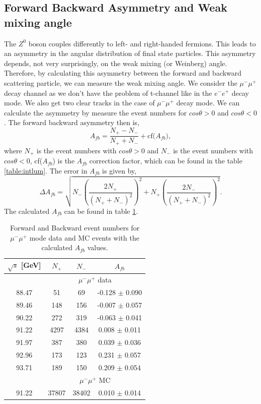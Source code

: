 \subsection{Forward Backward Asymmetry and Weak mixing angle}
The $Z^0$ boson couples differently to left- and right-handed fermions. This leads to an asymmetry in the angular distribution of final state particles. This asymmetry depends, not very surprisingly, on the weak mixing (or Weinberg) angle\cite{thomson_2013}. Therefore, by calculating this asymmetry between the forward and backward scattering particle, we can measure the weak mixing angle. We consider the $\mu^-\mu^+$ decay channel as we don't have the problem of t-channel like in the $e^-e^+$ decay mode. We also get two clear tracks in the case of $\mu^-\mu^+$ decay mode. We can calculate the asymmetry by measure the event numbers for $cos\theta > 0$ and $cos\theta < 0$. The forward backward asymmetry then is,
\begin{equation}
    A_{fb} = \frac{N_+ - N_-}{N_+ + N_-} + \text{cf($A_{fb}$)},
\end{equation}
where $N_+$ is the event numbers with $cos\theta > 0$ and $N_-$ is the event numbers with $cos\theta < 0$, cf($A_{fb}$) is the $A_{fb}$ correction factor, which can be found in the table \ref{table:intlum}. The error in $A_{fb}$ is given by,
\begin{equation}
    \Delta A_{fb} = \sqrt{N_-\left(\frac{2N_+}{(N_+ + N_-)^2}\right)^2 + 
    N_+\left(\frac{2N_-}{(N_+ + N_-)^2}\right)^2}.
\end{equation}
The calculated $A_{fb}$ can be found in table \ref{table:afb}.\\
\begin{table}[h!]
\centering
\begin{tabular}{c|ccc}
\hline
$\sqrt{s}$ {[}GeV{]} & $N_+$ & $N_-$ & $A_{fb}$           \\ \hline
                    & \multicolumn{3}{c}{$\mu^-\mu^+$ data}  \\ \hline
88.47                & 51    & 69    & -0.128 $\pm$ 0.090 \\
89.46                & 148   & 156   & -0.007 $\pm$ 0.057 \\
90.22                & 272   & 319   & -0.063 $\pm$ 0.041 \\
91.22                & 4297  & 4384  & 0.008 $\pm$ 0.011  \\
91.97                & 387   & 380   & 0.039 $\pm$ 0.036  \\
92.96                & 173   & 123   & 0.231 $\pm$ 0.057  \\
93.71                & 189   & 150   & 0.209 $\pm$ 0.054  \\ \hline
                     & \multicolumn{3}{c}{$\mu^-\mu^+$ MC}  \\ \hline
91.22                & 37807 & 38402 & 0.010 $\pm$ 0.014    \\ \hline
\end{tabular}
\caption{Forward and Backward event numbers for $\mu^-\mu^+$ mode data and MC events with the calculated $A_{fb}$ values.}
\label{table:afb}
\end{table}

